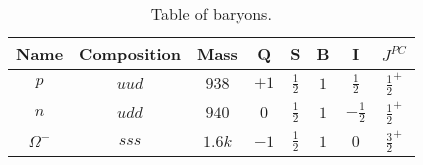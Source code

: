 \documentclass{article}
\begin{document}
\begin{table}[h!]
    \centering
    \begin{tabular}{||c c c c c c c c||} 
    \hline
    Name & Composition & Mass & Q & S & B & I & $J^{PC}$ \\ [0.5ex] 
    \hline\hline
    $p$ & $uud$ & $938$ & $+1$ & $\frac{1}{2}$ & $1$ & $\frac{1}{2}$ & $\frac{1}{2}^{+}$ \\[1ex]
    $n$ & $udd$ & $940$ & $0$ & $\frac{1}{2}$ & $1$ & $-\frac{1}{2}$ & $\frac{1}{2}^{+}$ \\[1ex]
    $\Omega^-$ & $sss$ & $1.6k$ & $-1$ & $\frac{1}{2}$ & $1$ & $0$ & $\frac{3}{2}^{+}$ \\[1ex]
    \hline
    \end{tabular}
    \caption{Table of baryons.}
    \label{table:baryons}
\end{table}
\end{document}
